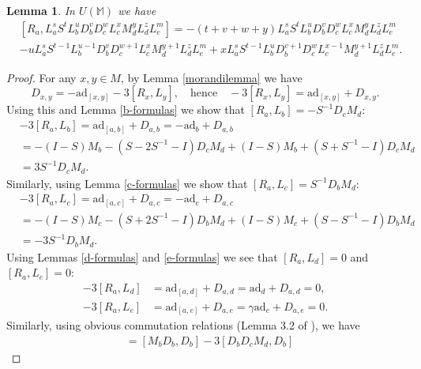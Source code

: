 \documentclass{amsart}
\theoremstyle{plain}
\newtheorem{lemma}{Lemma}[section]
\theoremstyle{definition}
\begin{document}
\begin{lemma} \label{Ra-bracket}
In $U(\mathbb{M})$ we have
  \allowdisplaybreaks
  \begin{align*}
  &
  [R_a, L_a^s S^t L_b^u D_b^v D_c^w L_c^x M_d^y L_d^z L_e^m]
  =
  -(t+v+w+y) L_a^s S^t L_b^u D_b^v D_c^w L_c^x M_d^y L_d^z L_e^m
  \\
  &
  - u L_a^s S^{t-1} L_b^{u-1} D_b^v D_c^{w+1} L_c^x M_d^{y+1}
  L_d^z L_e^m
  + x L_a^s S^{t-1} L_b^u D_b^{v+1} D_c^w L_c^{x-1}
  M_d^{y+1} L_d^z L_e^m.
  \end{align*}
\end{lemma}

\begin{proof}
For any $x,y\in M$, by Lemma \ref{morandilemma} we have
  \[
  D_{x,y}
  =
  - \mathrm{ad}_{[x,y]} - 3 [ R_x, L_y],
  \quad \text{hence} \quad
  -3 [R_x, L_y]
  =
  \mathrm{ad}_{[x,y]} + D_{x,y}.
  \]
Using this and Lemma \ref{b-formulas} we show that $[ R_a, L_b] = - S^{-1} D_c
M_d$:
  \allowdisplaybreaks
  \begin{align*}
  &
  -3 [R_a, L_b]
  =
  \mathrm{ad}_{[a,b]} + D_{a,b}
  =
  - \mathrm{ad}_b + D_{a,b}
  \\
  &=
  - (I-S) M_b - (S - 2S^{-1} - I) D_c M_d
  + (I-S) M_b + (S+ S^{-1} - I) D_c M_d
  \\
  &=
  3 S^{-1} D_c M_d.
  \end{align*}
Similarly, using Lemma \ref{c-formulas} we show that $[ R_a, L_c] = S^{-1} D_b
M_d$:
  \allowdisplaybreaks
  \begin{align*}
  &
  -3 [ R_a, L_c]
  =
  \mathrm{ad}_{[a,c]} + D_{a,c}
  =
  -\mathrm{ad}_c + D_{a,c}
  \\
  &=
  - (I-S)M_c - (S + 2 S^{-1} - I) D_b M_d
  + (I-S) M_c + (S- S^{-1} - I) D_b M_d
  \\
  &=
  -3 S^{-1} D_b M_d.
  \end{align*}
Using Lemmas \ref{d-formulas} and \ref{e-formulas} we see that $[R_a, L_d] = 0$
and $[ R_a, L_e ] = 0$:
  \allowdisplaybreaks
  \begin{align*}
  -3 [ R_a, L_d]
  &=
  \mathrm{ad}_{[a,d]} + D_{a,d}
  =
  \mathrm{ad}_d + D_{a,d} = 0,
  \\
  -3 [ R_a, L_e]
  &=
  \mathrm{ad}_{[a,e]} + D_{a,e}
  =
  \gamma\mathrm{ad}_e + D_{a,e} = 0.
  \end{align*}
Similarly, using obvious commutation relations (Lemma 3.2 of \cite{BHPU}), we
have
  \allowdisplaybreaks
  \begin{align*}
  [ R_a, D_b ]
  &=
  [ M_b D_b, D_b ] - 3 [ D_b D_c M_d, D_b ]

\end{align*}
\end{proof}
\end{document}
